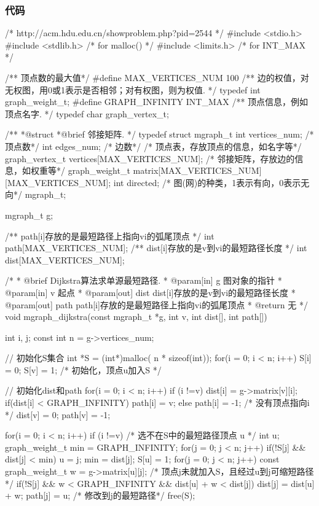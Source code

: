\subsubsection{代码}
\begin{Codex}[label=hdu_2544.c]
/* http://acm.hdu.edu.cn/showproblem.php?pid=2544 */
#include <stdio.h>
#include <stdlib.h>  /* for malloc() */
#include <limits.h>  /* for INT_MAX */

/** 顶点数的最大值*/
#define MAX_VERTICES_NUM 100
/** 边的权值，对无权图，用0或1表示是否相邻；对有权图，则为权值. */
typedef int graph_weight_t;
#define GRAPH_INFINITY INT_MAX
/** 顶点信息，例如顶点名字. */
typedef char graph_vertex_t;

/**
 *@struct
 *@brief 邻接矩阵.
 */
typedef struct mgraph_t {
    int vertices_num; /* 顶点数*/
    int edges_num; /* 边数*/
    /* 顶点表，存放顶点的信息，如名字等*/
    graph_vertex_t vertices[MAX_VERTICES_NUM];
    /* 邻接矩阵，存放边的信息，如权重等*/
    graph_weight_t matrix[MAX_VERTICES_NUM][MAX_VERTICES_NUM];
    int directed; /* 图(网)的种类，1表示有向，0表示无向*/
} mgraph_t;

mgraph_t g;

/** path[i]存放的是最短路径上指向vi的弧尾顶点 */
int path[MAX_VERTICES_NUM];
/** dist[i]存放的是v到vi的最短路径长度 */
int dist[MAX_VERTICES_NUM];


/*
  * @brief Dijkstra算法求单源最短路径.
  * @param[in] g 图对象的指针
  * @param[in] v 起点
  * @param[out] dist dist[i]存放的是v到vi的最短路径长度
  * @param[out] path path[i]存放的是最短路径上指向vi的弧尾顶点
  * @return 无
  */
void mgraph_dijkstra(const mgraph_t *g, int v, int dist[], int path[]) {
    int i, j;
    const int n = g->vertices_num;

    // 初始化S集合
    int *S = (int*)malloc( n * sizeof(int));
    for(i = 0; i < n; i++) S[i] = 0;
    S[v] = 1; /* 初始化，顶点u加入S */

    // 初始化dist和path
    for(i = 0; i < n; i++) if (i !=v) {
        dist[i] = g->matrix[v][i];
        if(dist[i] < GRAPH_INFINITY) {
            path[i] = v;
        }  else {
            path[i] = -1; /* 没有顶点指向i */
        }
    }
    dist[v] = 0;
    path[v] = -1;

    for(i = 0; i < n; i++) if (i !=v) {
        /* 选不在S中的最短路径顶点 u */
        int u;
        graph_weight_t min = GRAPH_INFINITY;
        for(j = 0; j < n; j++) {
            if(!S[j] && dist[j] < min) {
                u = j;
                min = dist[j];
            }
        }
        S[u] = 1;
        for(j = 0; j < n; j++) {
            const graph_weight_t w = g->matrix[u][j];
            /* 顶点j未就加入S，且经过u到j可缩短路径*/
            if(!S[j] && w < GRAPH_INFINITY &&
                dist[u] + w < dist[j]) {
                dist[j] = dist[u] + w;
                path[j] = u; /* 修改到j的最短路径*/
            }
        }
    }
    free(S);
}


\end{Codex}
